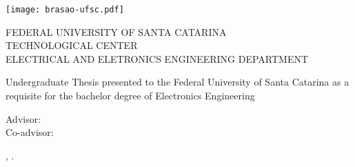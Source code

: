 \begin{titlepage}
  \begin{center}
    \texttt{[image: brasao-ufsc.pdf]}
  \end{center}

  \begin{center}
    {\small FEDERAL UNIVERSITY OF SANTA CATARINA}\\
    {\small TECHNOLOGICAL CENTER}\\
    {\small ELECTRICAL AND ELETRONICS ENGINEERING DEPARTMENT}
  \end{center}

  \vfill

  \begin{center}
    {\LARGE \thetitle}
  \end{center}

  \vfill

  \begin{center}
  Undergraduate Thesis presented to the Federal University of Santa
  Catarina as a requisite for the bachelor degree of Electronics 
  Engineering
  \end{center}

  \vfill

  \begin{center}
    {\large \theauthor}

    \medskip
    Advisor: \theadvisor\\
    Co-advisor: \thecoadvisor
  \end{center}

  \vfill

  \begin{center}
    \theplace, \thedate.
  \end{center}
\end{titlepage}

\cleardoublepageempty
